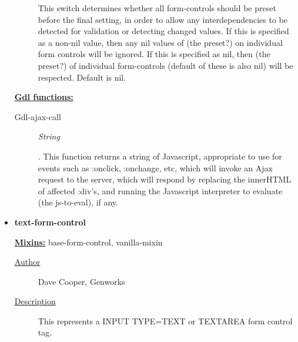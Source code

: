 \documentclass [11pt]{book}
\begin{document}
\begin{itemize}
\begin{description}
 This switch determines whether all form-controls should be preset
before the final setting, in order to allow any interdependencies to be detected
for validation or detecting changed values. If this is specified as a non-nil
value, then any nil values of (the preset?) on individual form controls will be
ignored. If this is specified as nil, then (the preset?) of individual
form-controls (default of these is also nil) will be respected. Default is nil.




\end{description}






\textbf{
\underline{Gdl functions:}}

\begin{description}

\item [Gdl-ajax-call]
\emph{String}

.
This function returns a string of Javascript, appropriate to use for events
such as :onclick, :onchange, etc, which will invoke an Ajax request to the
server, which will respond by replacing the innerHTML of affected :div's, and
running the Javascript interpreter to evaluate (the js-to-eval), if any.




\end{description}







\item {}
\label{prim:text-form-control}
\textbf{text-form-control}


\textbf{
\underline{Mixins:}} base-form-control, vanilla-mixin





\begin{description}

\item [
\underline{Author}]


Dave Cooper, Genworks



\item [
\underline{Description}]


This represents a INPUT TYPE=TEXT or TEXTAREA form control tag.




\end{description}
\end{itemize}
\end{document}
